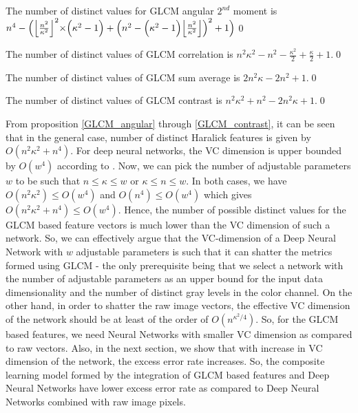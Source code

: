 \documentclass[11pt,a4paper]{article}
\DeclarePairedDelimiter\floor{\lfloor}{\rfloor}
\begin{document}
\begin{proposition}\label{GLCM_angular}
The number of distinct values for GLCM angular $2^{nd}$ moment is $n^4 - \Big({\floor*{\frac{n^2}{\kappa^2}}}^2{\times}\Big(\kappa^2-1\Big)+\Big(n^2-\Big(\kappa^2-1\Big)\floor*{\frac{n^2}{\kappa^2}}\Big)^2+1\Big)$\qed
\end{proposition}

\begin{proposition}
The number of distinct values of GLCM correlation is $n^2\kappa^2-n^2-\frac{\kappa^2}{2}+\frac{\kappa}{2}+1$.\qed
\end{proposition}

\begin{proposition}
The number of distinct values of GLCM sum average is $2n^2\kappa-2n^2+1$.\qed
\end{proposition}

\begin{proposition}\label{GLCM_contrast}
The number of distinct values of GLCM contrast is $n^2\kappa^2+n^2-2n^2\kappa+1$.\qed
\end{proposition}

From proposition \ref{GLCM_angular} through \ref{GLCM_contrast}, it can be seen that in the general case, number of distinct Haralick features is given by $O(n^2\kappa^2 + n^4)$. For deep neural networks, the VC dimension is upper bounded by $O(w^{4})$ according to \cite{Bartlett_vapnik-chervonenkisdimension}.
Now, we can pick the number of adjustable parameters $w$ to be such that $n{\leq}\kappa{\leq}w$ or $\kappa{\leq}n{\leq}w$. In both cases, we have $O(n^2\kappa^2){\leq}O(w^4)$ and $O(n^4){\leq}O(w^4)$ which gives $O(n^2\kappa^2+n^4){\leq}O(w^4)$.
Hence, the number of possible distinct values for the GLCM based feature vectors is much lower than the VC dimension of such a network. So, we can effectively argue that the VC-dimension of a Deep Neural Network with $w$ adjustable parameters is such that it can shatter the metrics formed using GLCM - the only prerequisite being that we select a network with the number of adjustable parameters as an upper bound for the input data dimensionality and the number of distinct gray levels in the color channel. On the other hand, in order to shatter the raw image vectors, the effective VC dimension of the network should be at least of the order of $O({n^{\kappa^2/4}})$. So, for the GLCM based features, we need Neural Networks with smaller VC dimension as compared to raw vectors. Also, in the next section, we show that with increase in VC dimension of the network, the excess error rate increases. So, the composite learning model formed by the integration of GLCM based features and Deep Neural Networks have lower excess error rate as compared to Deep Neural Networks combined with raw image pixels. 
\end{document}
